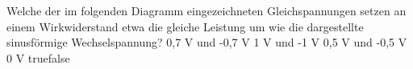     {Welche der im folgenden Diagramm eingezeichneten Gleichspannungen setzen an einem Wirkwiderstand etwa die gleiche Leistung um wie die dargestellte sinusförmige Wechselspannung?}
    {0,7 V und -0,7 V}
    {1 V und -1 V}
    {0,5 V und -0,5 V}
    {0 V}
    {true}{false}